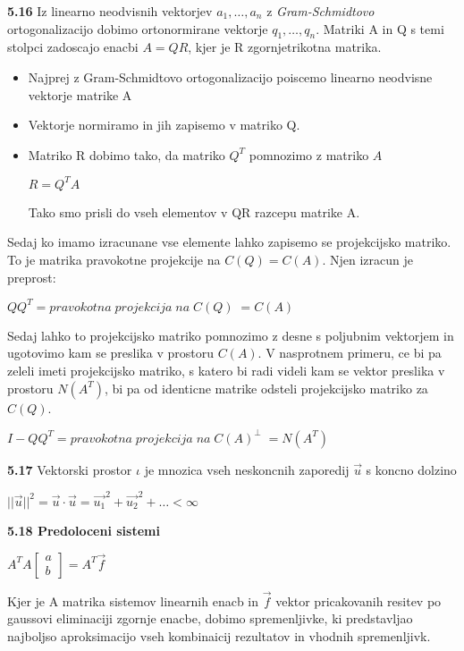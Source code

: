 \documentclass{article}
\begin{document}
\begin{multicols}{3}
\textbf{5.16} Iz linearno neodvisnih vektorjev $a_{1}, \dots, a_{n}$ z \textit{Gram-Schmidtovo} ortogonalizacijo
dobimo ortonormirane vektorje $q_{1}, \dots, q_{n}$. Matriki A in Q s temi stolpci zadoscajo enacbi $A = QR$, kjer
je R zgornjetrikotna matrika.
\begin{itemize}
    \item Najprej z Gram-Schmidtovo ortogonalizacijo poiscemo linearno neodvisne vektorje matrike A
    \item Vektorje normiramo in jih zapisemo v matriko Q.
    \item Matriko R dobimo tako, da matriko $Q^{T}$ pomnozimo z matriko $A$
    \begin{center}
        \begin{math}
            R = Q^{T}A
        \end{math}
    \end{center}
    Tako smo prisli do vseh elementov v QR razcepu matrike A.
\end{itemize}
Sedaj ko imamo izracunane vse elemente lahko zapisemo se projekcijsko matriko. To je matrika pravokotne projekcije na $C(Q) = C(A)$.
Njen izracun je preprost:
\begin{center}
    \begin{math}
        QQ^{T} = pravokotna\; projekcija\; na\; C(Q)\; = C(A)
    \end{math}
\end{center}
Sedaj lahko to projekcijsko matriko pomnozimo z desne s poljubnim vektorjem in ugotovimo kam se preslika v prostoru $C(A)$.
V nasprotnem primeru, ce bi pa zeleli imeti projekcijsko matriko, s katero bi radi videli kam se vektor preslika v prostoru $N(A^{T})$, bi pa od identicne matrike
odsteli projekcijsko matriko za $C(Q)$.
\begin{center}
    \begin{math}
        I - QQ^{T} = pravokotna\; projekcija\; na\; C(A)^{\perp}\; = N(A^{T})
    \end{math}
\end{center}

\textbf{5.17} Vektorski prostor $\iota$ je mnozica vseh neskoncnih zaporedij $\vec{u}$ s koncno
dolzino
\begin{center}
    $||\vec{u}||^{2} = \vec{u} \cdot \vec{u} = \vec{u_{1}}^{2} + \vec{u_{2}}^{2} + \dots < \infty$
\end{center}

\textbf{5.18 Predoloceni sistemi}
\begin{center}
    \begin{math}
        A^{T}A
        \begin{bmatrix}
            a\\
            b
        \end{bmatrix}
        = A^{T}\vec{f}
    \end{math}
\end{center}
Kjer je A matrika sistemov linearnih enacb in $\vec{f}$ vektor pricakovanih resitev
po gaussovi eliminaciji zgornje enacbe, dobimo spremenljivke, ki predstavljao najboljso aproksimacijo vseh kombinaicij rezultatov in vhodnih spremenljivk.


\end{multicols}
\end{document}
